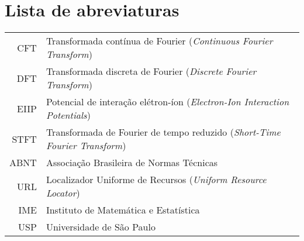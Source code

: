 \documentclass[12pt,twoside,english,brazilian]{book}
\begin{document}
\makeatletter
\if@openright\cleardoublepage\else\clearpage\fi
\makeatother


\newcommand\disablenewpage[1]{{\let\clearpage\par\let\cleardoublepage\par #1}}

\bgroup
\raggedbottom


\disablenewpage{\chapter*{Lista de abreviaturas}}

\begin{tabular}{rl}
   CFT & Transformada contínua de Fourier (\emph{Continuous Fourier Transform})\\
   DFT & Transformada discreta de Fourier (\emph{Discrete Fourier Transform})\\
  EIIP & Potencial de interação elétron-íon (\emph{Electron-Ion Interaction Potentials})\\
  STFT & Transformada de Fourier de tempo reduzido (\emph{Short-Time Fourier Transform})\\
  ABNT & Associação Brasileira de Normas Técnicas\\
   URL & Localizador Uniforme de Recursos (\emph{Uniform Resource Locator})\\
   IME & Instituto de Matemática e Estatística\\
   USP & Universidade de São Paulo
\end{tabular}
\end{document}
